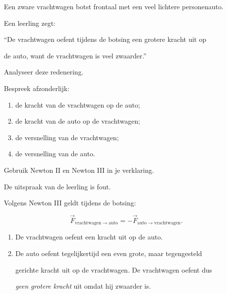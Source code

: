 \documentclass{ximera}
\begin{document}
\begin{oefening}{\oefU\ESS}

Een zware vrachtwagen botst frontaal met een veel lichtere personenauto.

Een leerling zegt:

\begin{center} ``De vrachtwagen oefent tijdens de botsing een grotere kracht uit op

de auto, want de vrachtwagen is veel zwaarder.''

\end{center}

Analyseer deze redenering.

Bespreek afzonderlijk:

\begin{enumerate}

 \item de kracht van de vrachtwagen op de auto;

 \item de kracht van de auto op de vrachtwagen;

 \item de versnelling van de vrachtwagen;

 \item de versnelling van de auto.

\end{enumerate}

Gebruik Newton II en Newton III in je verklaring.


\begin{oplossing}

De uitspraak van de leerling is fout.

Volgens Newton III geldt tijdens de botsing:

\[\boxed{ \vec F_{\mathrm{vrachtwagen}\rightarrow\mathrm{auto}} = -\vec F_{\mathrm{auto}\rightarrow\mathrm{vrachtwagen}} }.\]

\begin{enumerate}

  \item De vrachtwagen oefent een kracht uit op de auto.

  \item De auto oefent tegelijkertijd een even grote, maar tegengesteld

  gerichte kracht uit op de vrachtwagen. De vrachtwagen oefent dus

  \emph{geen grotere kracht} uit omdat hij zwaarder is.


\end{enumerate}
\end{oplossing}
\end{oefening}
\end{document}

